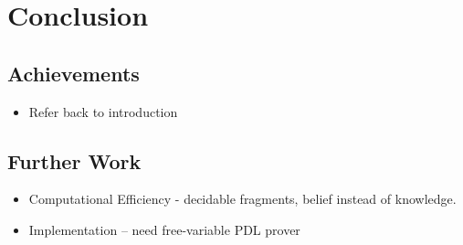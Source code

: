 

\chapter{Conclusion}

\label{ch:conclusion} %



\section{Achievements}

\begin{itemize}
\item Refer back to introduction 
\end{itemize}

\section{Further Work}

\begin{itemize}
\item Computational Efficiency - decidable fragments, belief instead of
knowledge. 
\item Implementation -- need free-variable PDL prover
\end{itemize}
